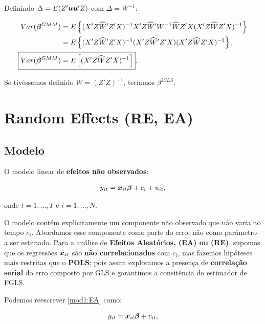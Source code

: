 \documentclass[11pt,oneside,a4paper]{article}
\numberwithin{equation}{section}
\begin{document}
\noindent
Definindo $\Delta = E(Z' \boldsymbol{u}\boldsymbol{u}' Z)$ com $\Delta = W^{-1}$:

\vspace{-1 em}
\begin{align*}
Var( \mbs{\beta}^{GMM} ) &=
E \left\{ 
( X' Z \widehat{W}' Z' X )^{-1}
X' Z \widehat{W}' W^{-1} \widehat{W} Z' X 
( X' Z \widehat{W} Z' X )^{-1}
\right\}
\\ &=
E \left\{ 
( X' Z \widehat{W}' Z' X )^{-1}
( X' Z \widehat{W}' Z' X )
( X' Z \widehat{W} Z' X )^{-1}
\right\}.
\\
\Aboxed{
Var( \mbs{\beta}^{GMM} ) &=
E \left[
( X' Z \widehat{W} Z' X )^{-1}
\right] }.
\end{align*}

\noindent
Se tivéssemos definido $W = (Z'Z)^{-1}$, teríamos $\beta^{2SLS}$.

\clearpage
\section{Random Effects (RE, EA)}


\subsection*{Modelo}

O modelo linear de \textbf{efeitos não observados}:

\vspace{-1 em}
\begin{align} \label{mod1:EA}
	y_{it} = \boldsymbol{x}_{it} \boldsymbol{\beta} + c_{i} + u_{it},
\end{align}

\noindent
onde
$t = 1, \dots, T$ e $i = 1, \dots, N$.

O modelo contém explicitamente um componente não observado que não varia no tempo $c_{i}$.
Abordamos esse componente como parte do erro, não como parâmetro a ser estimado.
Para a análise de \textbf{Efeitos Aleatórios, (EA) ou (RE)}, supomos que os regressões $\boldsymbol{x}_{it}$ são \textbf{não correlacionados} com $c_{i}$, mas fazemos hipóteses mais restritas que o \textbf{POLS}; pois assim exploramos a presença de \textbf{correlação serial} do erro composto por GLS e garantimos a consitência do estimador de FGLS.

Podemos reescrever \eqref{mod1:EA} como:

\vspace{-1 em}
\begin{align} \label{mod2:EA}
	y_{it} = \boldsymbol{x}_{it} \boldsymbol{\beta} + v_{it},
\end{align}
\end{document}
